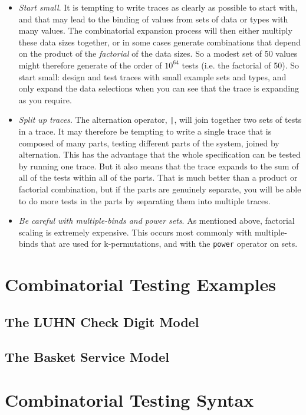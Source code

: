\documentclass{overturerepchap}
\begin{document}
\begin{itemize}
  \item \emph{Start small}. It is tempting to write traces as clearly as
  possible to start with, and that may lead to the binding of values from sets
  of data or types with many values. The combinatorial expansion process will
  then either multiply these data sizes together, or in some cases generate 
  combinations that depend on the product of the \emph{factorial} of the data
  sizes. So a modest set of 50 values might therefore generate of the order of
  $10^{64}$ tests (i.e. the factorial of 50). So start small: design and test 
  traces with small example sets and types, and only expand the data selections
  when you can see that the trace is expanding as you require.
  \item \emph{Split up traces}. The alternation operator, \texttt{|}, will join
  together two sets of tests in a trace. It may therefore be tempting to write a
  single trace that is composed of many parts, testing different parts of the
  system, joined by alternation. This has the advantage that the whole
  specification can be tested by running one trace. But it also means that the
  trace expands to the sum of all of the tests within all of the parts. That is
  much better than a product or factorial combination, but if the parts are
  genuinely separate, you will be able to do more tests in the parts by
  separating them into multiple traces.
  \item \emph{Be careful with multiple-binds and power sets}. As mentioned
  above, factorial scaling is extremely expensive. This occurs most commonly
  with multiple-binds that are used for k-permutations, and with the
  \texttt{power} operator on sets.
\end{itemize}

\chapter{Combinatorial Testing Examples}
\label{chap:examples}

\section{The LUHN Check Digit Model}
\section{The Basket Service Model}

\appendix
\chapter{Combinatorial Testing Syntax}
\label{chap:CTsyntax}
\end{document}
